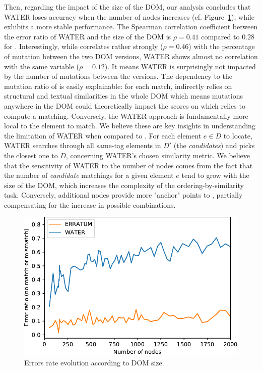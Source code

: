 Then, regarding the impact of the size of the DOM, our analysis concludes that
WATER loses accuracy when the number of nodes increases (cf.
Figure~\ref{fig:nbNodesAccuracy}), while \erratum{} exhibits a more stable
performance. The Spearman correlation coefficient between the error ratio of
WATER and the size of the DOM is $\rho = 0.41$ compared to $0.28$ for \erratum{}.
Interestingly, while \erratum{} correlates rather strongly ($\rho = 0.46$) with the
percentage of mutation between the two DOM versions, WATER shows almost no
correlation with the same variable ($\rho = 0.12$). It means WATER is surprisingly
not impacted by the number of mutations between the versions. The dependency to the
mutation ratio of \erratum{} is easily explainable: for each match, \erratum{}
indirectly relies on structural and textual similarities in the whole DOM which
means mutations anywhere in the DOM could theoretically impact the scores on
which \erratum{} relies to compute a matching. Conversely, the WATER approach is
fundamentally more local to the element to match. We believe these are key
insights in understanding the limitation of WATER when compared to \erratum{}.
For each element $e \in D$ to locate, WATER searches through all same-tag elements
in $D'$ (the \textit{candidates}) and picks the closest one to $D$, concerning WATER's chosen similarity metric. We believe that the sensitivity of WATER to
the number of nodes comes from the fact that the number of \textit{candidate}
matchings for a given element $e$ tend to grow with the size of the DOM, which
increases the complexity of the ordering-by-similarity task. Conversely,
additional nodes provide more "anchor" points to \erratum, partially
compensating for the increase in possible combinations.

\begin{figure}[]
  \centering
  \includegraphics[width=.8\linewidth]{erratum/mutation-numberNodes-mistake}
  \caption{Errors rate evolution according to DOM size.}
  \label{fig:nbNodesAccuracy}
\end{figure}

